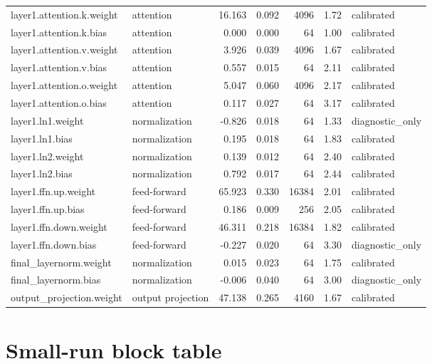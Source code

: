\documentclass[11pt]{article}
\begin{document}
\begin{longtable}{p{}p{}rrrrp{}}
layer1.attention.k.weight & attention & 16.163 & 0.092 & 4096 & 1.72 & calibrated \\
layer1.attention.k.bias & attention & 0.000 & 0.000 & 64 & 1.00 & calibrated \\
layer1.attention.v.weight & attention & 3.926 & 0.039 & 4096 & 1.67 & calibrated \\
layer1.attention.v.bias & attention & 0.557 & 0.015 & 64 & 2.11 & calibrated \\
layer1.attention.o.weight & attention & 5.047 & 0.060 & 4096 & 2.17 & calibrated \\
layer1.attention.o.bias & attention & 0.117 & 0.027 & 64 & 3.17 & calibrated \\
layer1.ln1.weight & normalization & -0.826 & 0.018 & 64 & 1.33 & diagnostic\_only \\
layer1.ln1.bias & normalization & 0.195 & 0.018 & 64 & 1.83 & calibrated \\
layer1.ln2.weight & normalization & 0.139 & 0.012 & 64 & 2.40 & calibrated \\
layer1.ln2.bias & normalization & 0.792 & 0.017 & 64 & 2.44 & calibrated \\
layer1.ffn.up.weight & feed-forward & 65.923 & 0.330 & 16384 & 2.01 & calibrated \\
layer1.ffn.up.bias & feed-forward & 0.186 & 0.009 & 256 & 2.05 & calibrated \\
layer1.ffn.down.weight & feed-forward & 46.311 & 0.218 & 16384 & 1.82 & calibrated \\
layer1.ffn.down.bias & feed-forward & -0.227 & 0.020 & 64 & 3.30 & diagnostic\_only \\
final\_layernorm.weight & normalization & 0.015 & 0.023 & 64 & 1.75 & calibrated \\
final\_layernorm.bias & normalization & -0.006 & 0.040 & 64 & 3.00 & diagnostic\_only \\
output\_projection.weight & output projection & 47.138 & 0.265 & 4160 & 1.67 & calibrated \\
\bottomrule
\end{longtable}
\normalsize

\section{Small-run block table}
\end{document}
